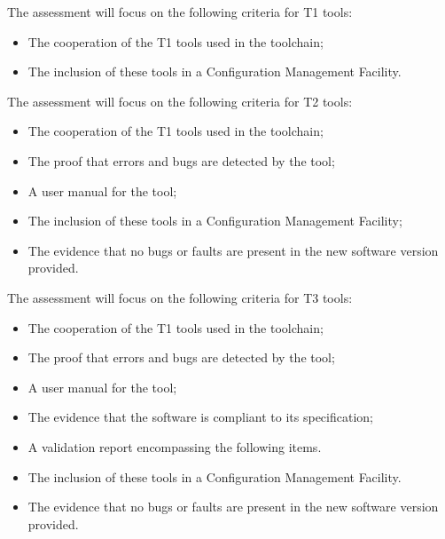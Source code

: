 \documentclass{template/openetcs_article}
\begin{document}
The assessment will focus on the following criteria for T1 tools:
\begin{itemize}
\item The cooperation of the T1 tools used in the toolchain;
\item The inclusion of these tools in a Configuration Management Facility.
\end{itemize}

The assessment will focus on the following criteria for T2 tools:
\begin{itemize}
\item The cooperation of the T1 tools used in the toolchain;
\item The proof that errors and bugs are detected by the tool;
\item A user manual for the tool;
\item The inclusion of these tools in a Configuration Management Facility;
\item The evidence that no bugs or faults are present in the new software version provided.
\end{itemize}

The assessment will focus on the following criteria for T3 tools:
\begin{itemize}
\item The cooperation of the T1 tools used in the toolchain;
\item The proof that errors and bugs are detected by the tool;
\item A user manual for the tool;
\item The evidence that the software is compliant to its specification;
\item A validation report encompassing the following items.
\item The inclusion of these tools in a Configuration Management Facility.
\item The evidence that no bugs or faults are present in the new software version provided.
\end{itemize}
\end{document}
